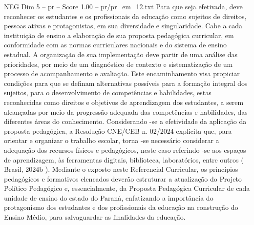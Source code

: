 \begin{textsample}{NEG Dim 5 – pr – Score 1.00 – pr/pr\_em\_12.txt}
Para que seja efetivada, deve reconhecer os estudantes e os profissionais da educação como sujeitos de direitos, pessoas ativas e protagonistas, em sua diversidade e singularidade.
Cabe a cada instituição de ensino a elaboração de sua proposta pedagógica curricular, em conformidade com as normas curriculares nacionais e do sistema de ensino estadual.
A organização de sua implementação deve partir de uma análise das prioridades, por meio de um diagnóstico de contexto e sistematização de um processo de acompanhamento e avaliação.
Este encaminhamento visa propiciar condições para que se definam alternativas possíveis para a formação integral dos sujeitos, para o desenvolvimento de competências e habilidades, estas reconhecidas como direitos e objetivos de aprendizagem dos estudantes, a serem alcançadas por meio da progressão adequada das competências e habilidades, das diferentes áreas do conhecimento.
Considerando -se a efetividade da aplicação da proposta pedagógica, a Resolução CNE/CEB n. 02/2024 explicita que, para orientar e organizar o trabalho escolar, torna -se necessário considerar a adequação dos recursos físicos e pedagógicos, neste caso referindo -se aos espaços de aprendizagem, às ferramentas digitais, biblioteca, laboratórios, entre outros ( Brasil, 2024b ).
Mediante o exposto neste Referencial Curricular, os princípios pedagógicos e formativos elencados deverão estruturar a atualização do Projeto Político Pedagógico e, essencialmente, da Proposta Pedagógica Curricular de cada unidade de ensino do estado do Paraná, enfatizando a importância do protagonismo dos estudantes e dos profissionais da educação na construção do Ensino Médio, para salvaguardar as finalidades da educação.

\end{textsample}
